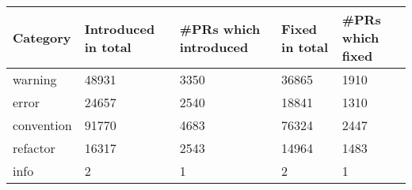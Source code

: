 \begin{tabular}{|p{2cm}p{2cm}p{2cm}p{2cm}p{2cm}|}
  \hline
Category & Introduced in total & \#PRs which introduced & Fixed in total & \#PRs which fixed \\ 
  \hline \hline
warning & 48931 & 3350 & 36865 & 1910 \\ 
  error & 24657 & 2540 & 18841 & 1310 \\ 
  convention & 91770 & 4683 & 76324 & 2447 \\ 
  refactor & 16317 & 2543 & 14964 & 1483 \\ 
  info & 2 & 1 & 2 & 1 \\ 
   \hline
\end{tabular}
